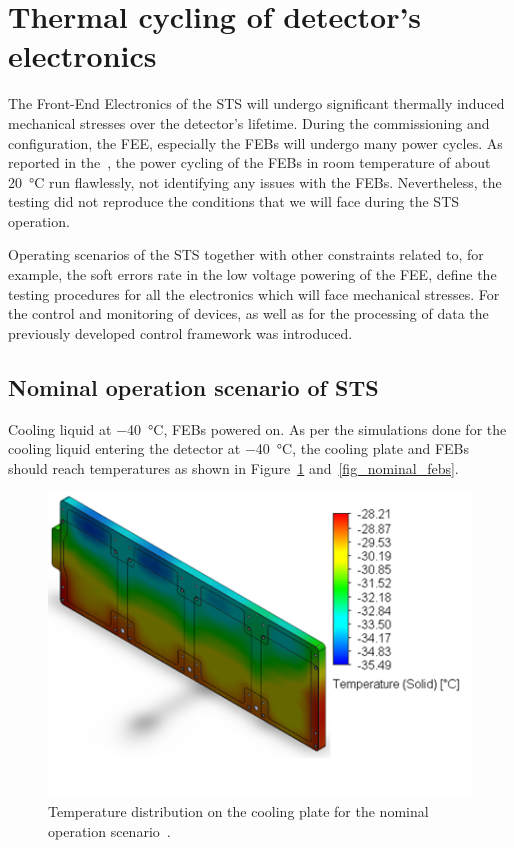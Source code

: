 \newpage
\section{Thermal cycling of detector's electronics}
\label{thermal_cycling}

The Front-End Electronics of the \gls{STS} will undergo significant thermally induced mechanical stresses over the detector's lifetime. During the commissioning and configuration, the \gls{FEE}, especially the \glspl{FEB} will undergo many power cycles. As reported in the~\cite{CBM_PR_2021}, the power cycling of the \glspl{FEB} in room temperature of about \SI{20}{\celsius} run flawlessly, not identifying any issues with the \glspl{FEB}. Nevertheless, the testing did not reproduce the conditions that we will face during the \gls{STS} operation.

Operating scenarios of the \gls{STS} together with other constraints related to, for example, the soft errors rate in the low voltage powering of the \gls{FEE}, define the testing procedures for all the electronics which will face mechanical stresses. For the control and monitoring of devices, as well as for the processing of data the previously developed control framework was introduced. 
\subsection{Nominal operation scenario of STS}
\label{nominal}

Cooling liquid at \SI{-40}{\celsius}, \gls{FEB}s powered on.
    As per the simulations done for the cooling liquid entering the detector at  \SI{-40}{\celsius}, the cooling plate and \gls{FEB}s should reach temperatures as shown in Figure~\ref{fig_coolinkg_block_nominal} and~\ref{fig_nominal_febs}.

    
\begin{figure}[!h]
\centering
\includegraphics[width=0.6\columnwidth]{Chapter4/images/cooling_block_nominal.png}
\caption{Temperature distribution on the cooling plate for the nominal operation scenario~\cite{thermal_cycling}.}
\label{fig_coolinkg_block_nominal}
\end{figure}

